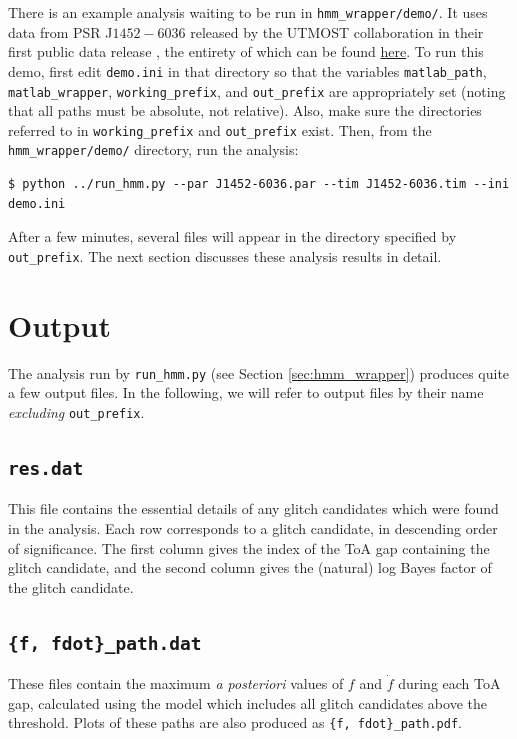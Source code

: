 \documentclass{article}
\begin{document}
There is an example analysis waiting to be run in \texttt{hmm\_wrapper/demo/}. It uses data from {PSR J${1452-6036}$} released by the UTMOST collaboration in their first public data release \citep{LowerBailes2020}, the entirety of which can be found \href{https://github.com/Molonglo/TimingDataRelease1}{here}.
To run this demo, first edit \texttt{demo.ini} in that directory so that the variables \texttt{matlab\_path}, \texttt{matlab\_wrapper}, \texttt{working\_prefix}, and \texttt{out\_prefix} are appropriately set (noting that all paths must be absolute, not relative).
Also, make sure the directories referred to in \texttt{working\_prefix} and \texttt{out\_prefix} exist.
Then, from the \texttt{hmm\_wrapper/demo/} directory, run the analysis:
\begin{lstlisting}
$ python ../run_hmm.py --par J1452-6036.par --tim J1452-6036.tim --ini demo.ini
\end{lstlisting}
After a few minutes, several files will appear in the directory specified by \texttt{out\_prefix}.
The next section discusses these analysis results in detail.
\section{Output}
The analysis run by \texttt{run\_hmm.py} (see Section \ref{sec:hmm_wrapper}) produces quite a few output files.
In the following, we will refer to output files by their name \emph{excluding} \texttt{out\_prefix}.

\subsection{\texttt{res.dat}}
This file contains the essential details of any glitch candidates which were found in the analysis.
Each row corresponds to a glitch candidate, in descending order of significance.
The first column gives the index of the ToA gap containing the glitch candidate, and the second column gives the (natural) log Bayes factor of the glitch candidate.

\subsection{\texttt{\{f, fdot\}\_path.dat}}
These files contain  the maximum \emph{a posteriori} values of $f$ and $\dot{f}$ during each ToA gap, calculated using the model which includes all glitch candidates above the threshold.
Plots of these paths are also produced as \texttt{\{f, fdot\}\_path.pdf}.
\end{document}
